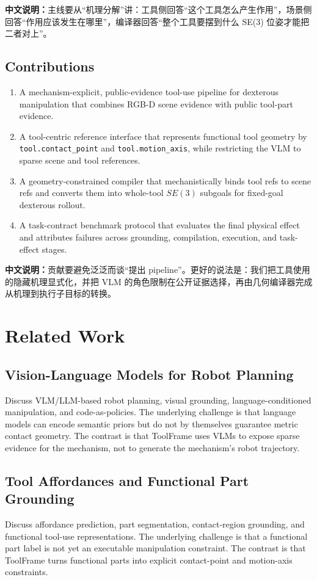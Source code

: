 \documentclass[journal]{IEEEtran}
\newcommand{\method}{ToolFrame}
\newcommand{\cn}[1]{\par\smallskip\noindent\textbf{中文说明：}#1\par\smallskip}
\begin{document}
\cn{主线要从“机理分解”讲：工具侧回答“这个工具怎么产生作用”，场景侧回答“作用应该发生在哪里”，编译器回答“整个工具要摆到什么 SE(3) 位姿才能把二者对上”。}

\subsection{Contributions}
\begin{enumerate}
  \item A mechanism-explicit, public-evidence tool-use pipeline for dexterous
  manipulation that combines RGB-D scene evidence with public tool-part
  evidence.
  \item A tool-centric reference interface that represents functional tool
  geometry by \texttt{tool.contact\_point} and
  \texttt{tool.motion\_axis}, while restricting the VLM to sparse scene and
  tool references.
  \item A geometry-constrained compiler that mechanistically binds tool refs to
  scene refs and converts them into whole-tool $SE(3)$ subgoals for fixed-goal
  dexterous rollout.
  \item A task-contract benchmark protocol that evaluates the final physical
  effect and attributes failures across grounding, compilation, execution, and
  task-effect stages.
\end{enumerate}

\cn{贡献要避免泛泛而谈“提出 pipeline”。更好的说法是：我们把工具使用的隐藏机理显式化，并把 VLM 的角色限制在公开证据选择，再由几何编译器完成从机理到执行子目标的转换。}

\section{Related Work}
\subsection{Vision-Language Models for Robot Planning}
Discuss VLM/LLM-based robot planning, visual grounding, language-conditioned
manipulation, and code-as-policies. The underlying challenge is that language
models can encode semantic priors but do not by themselves guarantee metric
contact geometry. The contrast is that \method{} uses VLMs to expose sparse
evidence for the mechanism, not to generate the mechanism's robot trajectory.

\subsection{Tool Affordances and Functional Part Grounding}
Discuss affordance prediction, part segmentation, contact-region grounding, and
functional tool-use representations. The underlying challenge is that a
functional part label is not yet an executable manipulation constraint. The
contrast is that \method{} turns functional parts into explicit contact-point
and motion-axis constraints.
\end{document}
